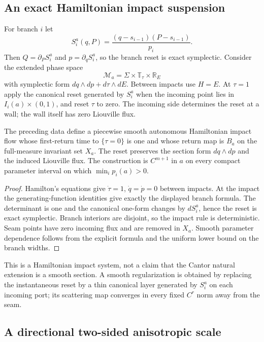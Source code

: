 \subsection{An exact Hamiltonian impact suspension}

For branch $i$ let
\[
 S_i^a(q,P)=\frac{(q-s_{i-1})(P-s_{i-1})}{p_i}.
\]
Then $Q=\partial_PS_i^a$ and $p=\partial_qS_i^a$, so the branch reset is exact
symplectic.  Consider the extended phase space
\[
 \mathcal M_a=\Sigma\times\mathbb T_\tau\times\mathbb R_E
\]
with symplectic form $dq\wedge dp+d\tau\wedge dE$.  Between impacts use
$H=E$.  At $\tau=1$ apply the canonical reset generated by $S_i^a$ when the
incoming point lies in $I_i(a)\times(0,1)$, and reset $\tau$ to zero.  The
incoming side determines the reset at a wall; the wall itself has zero
Liouville flux.

\begin{theorem}
\label{thm:r9-a1-impact}
The preceding data define a piecewise smooth autonomous Hamiltonian impact
flow whose first-return time to $\{\tau=0\}$ is one and whose return map is
$B_a$ on the full-measure invariant set $X_a$.  The reset preserves the
section form $dq\wedge dp$ and the induced Liouville flux.  The construction is
$C^{m+1}$ in $a$ on every compact parameter interval on which
$\min_i p_i(a)>0$.
\end{theorem}

\begin{proof}
Hamilton's equations give $\dot\tau=1$, $\dot q=\dot p=0$ between impacts.
At the impact the generating-function identities give exactly the displayed
branch formula.  The determinant is one and the canonical one-form changes by
$dS_i^a$, hence the reset is exact symplectic.  Branch interiors are disjoint,
so the impact rule is deterministic.  Seam points have zero incoming flux and
are removed in $X_a$.  Smooth parameter dependence follows from the explicit
formula and the uniform lower bound on the branch widths.
\end{proof}

This is a Hamiltonian impact system, not a claim that the Cantor natural
extension is a smooth section.  A smooth regularization is obtained by
replacing the instantaneous reset by a thin canonical layer generated by
$S_i^a$ on each incoming port; its scattering map converges in every fixed
$C^r$ norm away from the seam.

\subsection{A directional two-sided anisotropic scale}

